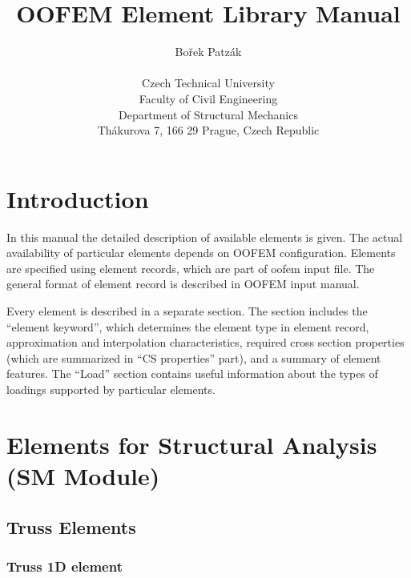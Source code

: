 \documentclass[a4paper]{article}
\begin{document}
\title{OOFEM Element Library Manual}
\author{Bořek Patzák \\ \\
Czech Technical University\\
Faculty of Civil Engineering\\
Department of Structural Mechanics\\
Th\'akurova 7, 166 29 Prague, Czech Republic
}
\maketitle

\newpage
\tableofcontents
\newpage
\listoffigures

\section{Introduction}
In this manual the detailed description of available elements 
is given. The actual availability of particular elements depends on
OOFEM configuration. Elements are specified using element records,
which are part of oofem input file. The general format of element
record is described in OOFEM input manual. 

Every element is described in a separate section. The section includes the ``element keyword'', which
determines the element type in element record, approximation and
interpolation characteristics, required cross section properties
(which are summarized in ``CS properties'' part), and a summary of
element features. The ``Load'' section contains useful
information about the types of loadings supported by particular elements.



\section{Elements for Structural Analysis (SM Module)}


\subsection{Truss Elements}

\subsubsection{Truss 1D element}
\label{Truss1d}
\end{document}
